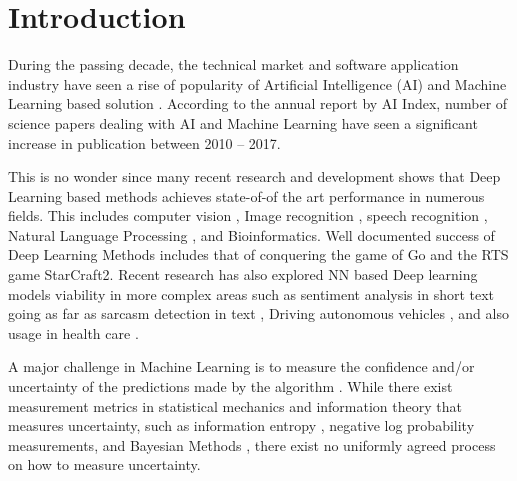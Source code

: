 \chapter{Introduction}

During the passing decade, the technical market and software application industry have seen a rise of popularity of Artificial Intelligence (AI) and Machine Learning based solution \cite{forbesaireport2018}. According to the annual report by AI Index\cite{aiindex2018}, number of science papers dealing with AI and Machine Learning have seen a significant increase in publication between 2010 -- 2017.

This is no wonder since many recent research and development shows that Deep  Learning based methods achieves state-of-of the art performance in numerous fields. This includes computer vision \cite{krizhevsky2012imagenet}, Image recognition \cite{simonyan2014very}, speech recognition \cite{hinton2012deep}, Natural Language Processing \cite{mikolov2013efficient}, and Bioinformatics\cite{alipanahi2015predicting}.
Well documented success of Deep Learning Methods includes that of conquering the game of Go\cite{silver2016mastering} and the RTS game StarCraft2\cite{vinyals2017starcraft}. Recent research has also explored NN based Deep learning models viability in more complex areas such as sentiment analysis in short text \cite{dos2014deep} going as far as sarcasm detection in text \cite{poria2016deeper,ptavcek2014sarcasm}, Driving autonomous vehicles \cite{bojarski2016end}, and also usage in health care \cite{miotto2017deep}.

A major challenge in Machine Learning is to measure the confidence and/or uncertainty of the predictions made by the algorithm \cite{quinonero2006evaluating}. While there exist measurement metrics in statistical mechanics and information theory that measures uncertainty, such as information entropy \cite{shannon1948mathematical}, negative log probability measurements\cite{quinonero2006evaluating}, and Bayesian Methods \cite{gal2016dropout}, there exist no uniformly agreed process on how to measure uncertainty.

